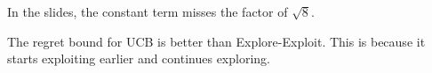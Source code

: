 \documentclass[11pt]{article}
\begin{document}
In the slides, the constant term misses the factor of $\sqrt{8}$.

The regret bound for UCB is better than Explore-Exploit. This is because it starts exploiting earlier and continues exploring.

\newpage
{


}


\end{document}

